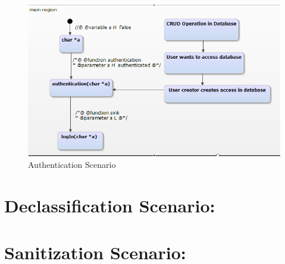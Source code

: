 \begin{figure}[htbp]
	\centering
	\includegraphics{styles/authentication_scenario.png}
	\caption{Authentication Scenario}
\end{figure}

\section{Declassification Scenario:}

\section{Sanitization Scenario:}
